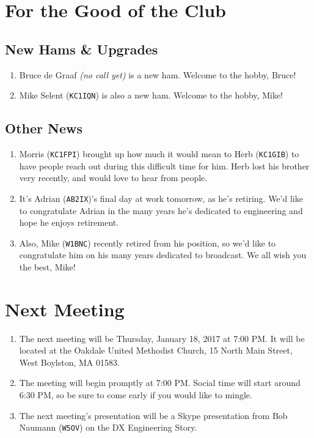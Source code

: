 \documentclass[10pt,letterpaper]{article}
\begin{document}
\section{For the Good of the Club}

\subsection{New Hams \& Upgrades}
\begin{enumerate}
  \item Bruce de Graaf \emph{(no call yet)} is a new ham. Welcome to the hobby, Bruce!
  \item Mike Selent (\texttt{KC1IQN}) is also a new ham. Welcome to the hobby, Mike!
\end{enumerate}

\subsection{Other News}
\begin{enumerate}
  \item Morris (\texttt{KC1FPI}) brought up how much it would mean to Herb (\texttt{KC1GIB}) to have people reach out during this difficult time for him. Herb lost his brother very recently, and would love to hear from people.
  \item It's Adrian (\texttt{AB2IX})'s final day at work tomorrow, as he's retiring. We'd like to congratulate Adrian in the many years he's dedicated to engineering and hope he enjoys retirement.
  \item Also, Mike (\texttt{W1BNC}) recently retired from his position, so we'd like to congratulate him on his many years dedicated to broadcast. We all wish you the best, Mike!
\end{enumerate}

\section{Next Meeting}
\begin{enumerate}
  \item The next meeting will be Thursday, January 18, 2017 at 7:00 PM. It will be located at the Oakdale United Methodist Church, 15 North Main Street, West Boylston, MA 01583.
  \item The meeting will begin promptly at 7:00 PM. Social time will start around 6:30 PM, so be sure to come early if you would like to mingle.
  \item The next meeting's presentation will be a Skype presentation from Bob Naumann (\texttt{W5OV}) on the DX Engineering Story.
\end{enumerate}
\end{document}
